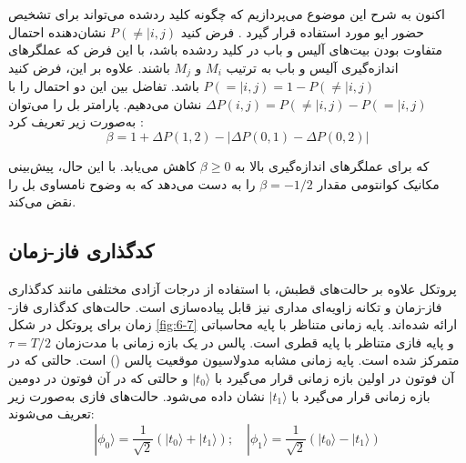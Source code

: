 اکنون به شرح این موضوع می‌پردازیم که چگونه کلید ردشده می‌تواند برای تشخیص حضور ایو مورد استفاده قرار گیرد \cite{40}. فرض کنید $P(\neq|i,j)$ نشان‌دهنده احتمال متفاوت بودن بیت‌های آلیس و باب در کلید ردشده باشد، با این فرض که عملگرهای اندازه‌گیری آلیس و باب به ترتیب $M_i$ و $M_j$ باشند. علاوه بر این، فرض کنید $P(=|i,j) = 1 - P(\neq|i,j)$ باشد. تفاضل بین این دو احتمال را با $\Delta P(i,j) = P(\neq|i,j) - P(=|i,j)$ نشان می‌دهیم. پارامتر بل را می‌توان به‌صورت زیر تعریف کرد \cite{40}:
\begin{equation}
	\beta = 1 + \Delta P(1,2) - |\Delta P(0,1) - \Delta P(0,2)|
	\label{eq:6-20}
\end{equation}


که برای عملگرهای اندازه‌گیری بالا به $\beta \geq 0$ کاهش می‌یابد. با این حال، پیش‌بینی مکانیک کوانتومی مقدار $\beta = -1/2$ را به دست می‌دهد که به وضوح نامساوی بل را نقض می‌کند.

\subsection{کدگذاری فاز-زمان}
\label{sec:6-4-4}
پروتکل  علاوه بر حالت‌های قطبش، با استفاده از درجات آزادی مختلفی مانند کدگذاری فاز-زمان \cite{41,42,43} و تکانه زاویه‌ای مداری \cite{44,45} نیز قابل پیاده‌سازی است. حالت‌های کدگذاری فاز-زمان برای پروتکل  در شکل \ref{fig:6-7} ارائه شده‌اند. پایه زمانی متناظر با پایه محاسباتی و پایه فازی متناظر با پایه قطری است. پالس در یک بازه زمانی با مدت‌زمان $\tau = T/2$ متمرکز شده است. پایه زمانی مشابه مدولاسیون موقعیت پالس () است. حالتی که در آن فوتون در اولین بازه زمانی قرار می‌گیرد با $|t_0\rangle$ و حالتی که در آن فوتون در دومین بازه زمانی قرار می‌گیرد با $|t_1\rangle$ نشان داده می‌شود. حالت‌های  فازی به‌صورت زیر تعریف می‌شوند:
\begin{equation}
	|\phi_0\rangle = \frac{1}{\sqrt{2}} (|t_0\rangle + |t_1\rangle); \quad |\phi_1\rangle = \frac{1}{\sqrt{2}} (|t_0\rangle - |t_1\rangle)
	\label{eq:6-21}
\end{equation}

